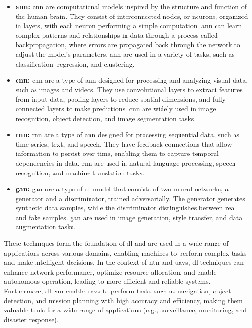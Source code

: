 \begin{itemize}
  \item \textbf{\gls{ann}:} \gls{ann} are computational models inspired by the structure and function of the human brain. They consist of interconnected nodes, or neurons, organized in layers, with each neuron performing a simple computation. \gls{ann} can learn complex patterns and relationships in data through a process called backpropagation, where errors are propagated back through the network to adjust the model's parameters. \gls{ann} are used in a variety of tasks, such as classification, regression, and clustering.

  \item \textbf{\gls{cnn}:} \gls{cnn} are a type of \gls{ann} designed for processing and analyzing visual data, such as images and videos. They use convolutional layers to extract features from input data, pooling layers to reduce spatial dimensions, and fully connected layers to make predictions. \gls{cnn} are widely used in image recognition, object detection, and image segmentation tasks.

  \item \textbf{\gls{rnn}:} \gls{rnn} are a type of \gls{ann} designed for processing sequential data, such as time series, text, and speech. They have feedback connections that allow information to persist over time, enabling them to capture temporal dependencies in data. \gls{rnn} are used in natural language processing, speech recognition, and machine translation tasks.

  \item \textbf{\gls{gan}:} \gls{gan} are a type of \gls{dl} model that consists of two neural networks, a generator and a discriminator, trained adversarially. The generator generates synthetic data samples, while the discriminator distinguishes between real and fake samples. \gls{gan} are used in image generation, style transfer, and data augmentation tasks.
\end{itemize}

These techniques form the foundation of \gls{dl} and are used in a wide range of applications across various domains, enabling machines to perform complex tasks and make intelligent decisions. In the context of \gls{ntn} and \glspl{uav}, \gls{dl} techniques can enhance network performance, optimize resource allocation, and enable autonomous operation, leading to more efficient and reliable systems. Furthermore, \gls{dl} can enable \glspl{uav} to perform tasks such as navigation, object detection, and mission planning with high accuracy and efficiency, making them valuable tools for a wide range of applications (e.g., surveillance, monitoring, and disaster response).
